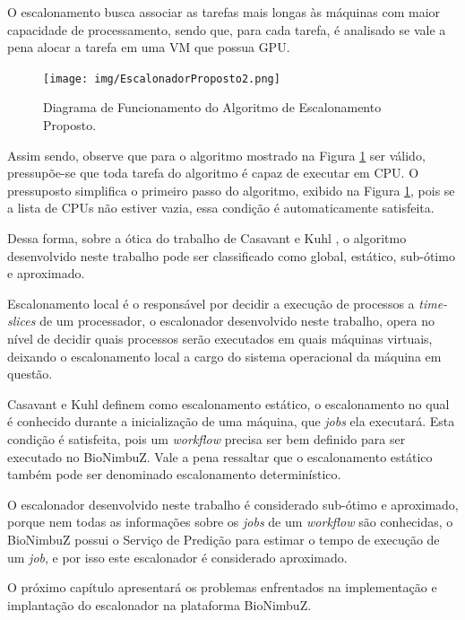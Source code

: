 O escalonamento busca associar as tarefas mais longas às máquinas com maior capacidade de processamento, sendo que, para cada tarefa, é analisado se vale a pena alocar a tarefa em uma \acrshort{VM} que possua \acrshort{GPU}.


\begin{figure}[htbp]
	\centerline{\texttt{[image: img/EscalonadorProposto2.png]}}
	\caption{Diagrama de Funcionamento do Algoritmo de Escalonamento Proposto.}
	\label{Escalonamento}
\end{figure}


Assim sendo, observe que para o algoritmo mostrado na Figura \ref{Escalonamento} ser válido, pressupõe-se que toda tarefa do algoritmo é capaz de executar em \acrshort{CPU}. O pressuposto simplifica o primeiro passo do algoritmo, exibido na Figura \ref{Escalonamento}, pois se a lista de \acrshort{CPU}s não estiver vazia, essa condição é automaticamente satisfeita.

Dessa forma, sobre a ótica do trabalho de Casavant e Kuhl \cite{4634_TaxonomiaEscalonador}, o algoritmo desenvolvido neste trabalho pode ser classificado como global, estático, sub-ótimo e aproximado.%

Escalonamento local é o responsável por decidir a execução de processos a \textit{time-slices} de um processador, o escalonador desenvolvido neste trabalho, opera no nível de decidir quais processos serão executados em quais máquinas virtuais, deixando o escalonamento local a cargo do sistema operacional da máquina em questão.

Casavant e Kuhl \cite{4634_TaxonomiaEscalonador} definem como escalonamento estático, o escalonamento no qual é conhecido durante a inicialização de uma máquina, que \textit{jobs} ela executará. Esta condição é satisfeita, pois um \textit{workflow} precisa ser bem definido para ser executado no BioNimbuZ. Vale a pena ressaltar que o escalonamento estático também pode ser denominado escalonamento determinístico.

O escalonador desenvolvido neste trabalho é considerado sub-ótimo e aproximado, porque nem todas as informações sobre os \textit{jobs} de um \textit{workflow} são conhecidas, o BioNimbuZ possui o Serviço de Predição para estimar o tempo de execução de um \textit{job}, e por isso este escalonador é considerado aproximado.


O próximo capítulo apresentará os problemas enfrentados na implementação e implantação do escalonador na plataforma BioNimbuZ.




